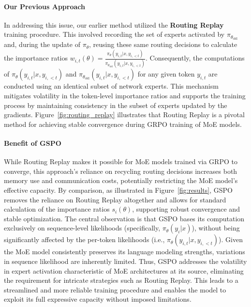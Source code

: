 \paragraph{Our Previous Approach} In addressing this issue, our earlier method utilized the \textbf{Routing Replay} training procedure. This involved recording the set of experts activated by $\pi_{\theta_\text{old}}$ and, during the update of $\pi_{\theta}$, reusing these same routing decisions to calculate the importance ratios $w_{i,t}(\theta) = \frac{ \pi_{\theta} (y_{i,t} | x, y_{i,<t}) }{ \pi_{\theta_\text{old}} (y_{i,t} | x,y_{i,<t})}$. Consequently, the computations of $\pi_{\theta} (y_{i,t} | x, y_{i,<t})$ and $\pi_{\theta_\text{old}} (y_{i,t} | x,y_{i,<t})$ for any given token $y_{i,t}$ are conducted using an identical subset of network experts. This mechanism mitigates volatility in the token-level importance ratios and supports the training process by maintaining consistency in the subset of experts updated by the gradients. Figure~\ref{fig:routing_replay} illustrates that Routing Replay is a pivotal method for achieving stable convergence during GRPO training of MoE models.

\paragraph{Benefit of GSPO} While Routing Replay makes it possible for MoE models trained via GRPO to converge, this approach's reliance on recycling routing decisions increases both memory use and communication costs, potentially restricting the MoE model's effective capacity. By comparison, as illustrated in Figure~\ref{fig:results}, GSPO removes the reliance on Routing Replay altogether and allows for standard calculation of the importance ratios $s_i(\theta)$, supporting robust convergence and stable optimization. The central observation is that GSPO bases its computation exclusively on sequence-level likelihoods (specifically, $\pi_{\theta} (y_i | x)$), without being significantly affected by the per-token likelihoods (i.e., $\pi_{\theta} (y_{i,t} | x, y_{i,<t})$). Given the MoE model consistently preserves its language modeling strengths, variations in sequence likelihood are inherently limited. Thus, GSPO addresses the volatility in expert activation characteristic of MoE architectures at its source, eliminating the requirement for intricate strategies such as Routing Replay. This leads to a streamlined and more reliable training procedure and enables the model to exploit its full expressive capacity without imposed limitations.

